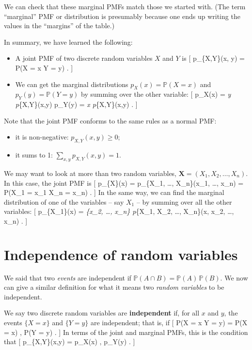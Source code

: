 \documentclass[
  letterpaper,
]{report}
\providecommand{\tightlist}{%
  \setlength{\itemsep}{0pt}\setlength{\parskip}{0pt}}\usepackage{longtable,booktabs,array}
\theoremstyle{definition}
\theoremstyle{definition}
\theoremstyle{remark}
\begin{document}
We can check that these marginal PMFs match those we started with. (The
term ``marginal'' PMF or distribution is presumably because one ends up
writing the values in the ``margins'' of the table.)

In summary, we have learned the following:

\begin{itemize}
\tightlist
\item
  A joint PMF of two discrete random variables \(X\) and \(Y\) is {[}
  p\_\{X,Y\}(x, y) = \mathbb P(X = x  Y = y) . {]}
\item
  We can get the marginal distributions \(p_X(x) = \mathbb P(X = x)\)
  and \(p_Y(y) = \mathbb P(Y = y)\) by summing over the other variable:
  {[} p\_X(x) = \sum\emph{y p}\{X,Y\}(x,y) \qquad p\_Y(y) = \sum\emph{x
  p}\{X,Y\}(x,y) . {]}
\end{itemize}

Note that the joint PMF conforms to the same rules as a normal PMF:

\begin{itemize}
\tightlist
\item
  it is non-negative: \(p_{X,Y}(x,y) \geq 0\);
\item
  it sums to 1: \(\displaystyle\sum_{x,y} p_{X,Y}(x,y) = 1\).
\end{itemize}

We may want to look at more than two random variables,
\(\mathbf X = (X_1, X_2, \dots, X_n)\). In this case, the joint PMF is
{[} p\_\{\mathbf X\}(\mathbf x) = p\_\{X\_1, \dots, X\_n\}(x\_1, \dots,
x\_n) = \mathbb P(X\_1 = x\_1  \cdots {} X\_n =
x\_n) . {]} In the same way, we can find the marginal distribution of
one of the variables -- say \(X_1\) -- by summing over all the other
variables: {[} p\_\{X\_1\}(x) = \sum\emph{\{x\_2, \dots, x\_n\}
p}\{X\_1, X\_2, \dots, X\_n\}(x, x\_2, \dots, x\_n) . {]}

\hypertarget{independence-rv}{%
\section{Independence of random variables}\label{independence-rv}}

We said that two \emph{events} are independent if
\(\mathbb P(A \cap B) = \mathbb P(A)\, \mathbb P(B)\). We now can give a
similar definition for what it means two \emph{random variables} to be
independent.

We say two discrete random variables are \textbf{independent} if, for
all \(x\) and \(y\), the events \(\{X = x\}\) and \(\{Y = y\}\) are
independent; that is, if {[} \mathbb P(X = x  Y = y) =
\mathbb P(X = x) , \mathbb P(Y = y) . {]} In terms of the joint and
marginal PMFs, this is the condition that {[} p\_\{X,Y\}(x,y) = p\_X(x)
, p\_Y(y) . {]}
\end{document}
